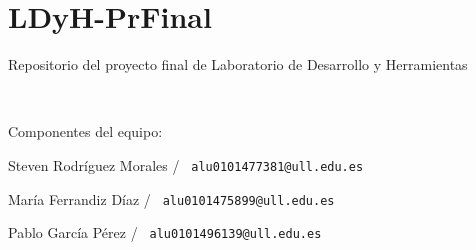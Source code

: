 \chapter{LDy\+H-\/\+Pr\+Final}
\label{md__r_e_a_d_m_e}
\label{md__r_e_a_d_m_e_autotoc_md0}%


Repositorio del proyecto final de Laboratorio de Desarrollo y Herramientas

{\texttt{ }} {\texttt{ }}

Componentes del equipo\+:
\begin{DoxyItemize}
\item Steven Rodríguez Morales / {\texttt{ alu0101477381@ull.\+edu.\+es}}
\item María Ferrandiz Díaz / {\texttt{ alu0101475899@ull.\+edu.\+es}}
\item Pablo García Pérez / {\texttt{ alu0101496139@ull.\+edu.\+es}} 
\end{DoxyItemize}